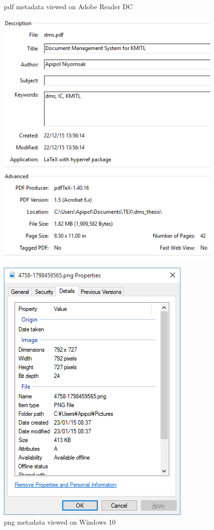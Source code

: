 \begin{figure}[h]
	\centering
	\begin{minipage}{0.45\textwidth}
		\centering
		\caption{\acrfull{pdf} metadata viewed on Adobe Reader DC}
		\label{metadata-ex-pdf}
		\includegraphics*[scale=0.6]{res/bg-knowledge/metadata-ex-pdf}
	\end{minipage} \hfill
	\begin{minipage}{0.45\textwidth}
		\centering
		\caption{\acrfull{png} metadata viewed on Windows 10}
		\label{metadata-ex-png}		
		\includegraphics*[scale=0.6]{res/bg-knowledge/metadata-ex-png}
	\end{minipage} \hfill	
\end{figure}

